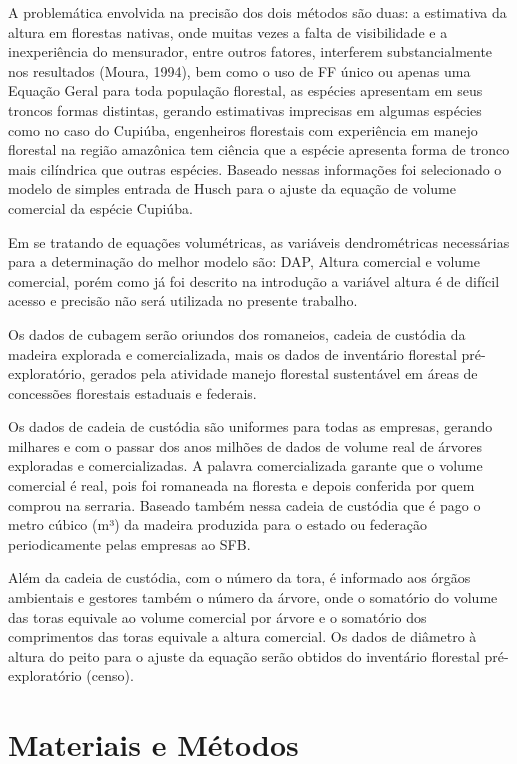 \documentclass[a4paper,12pt]{article}
\begin{document}
A problemática envolvida na precisão dos dois métodos são duas: a estimativa da altura em florestas nativas, onde muitas vezes a falta de visibilidade e a inexperiência do mensurador, entre outros fatores, interferem substancialmente nos resultados (Moura, 1994), bem como o uso de FF único ou apenas uma Equação Geral para toda população florestal, as espécies apresentam em seus troncos formas distintas, gerando estimativas imprecisas em algumas espécies como no caso do Cupiúba, engenheiros florestais com experiência em manejo florestal na região amazônica tem ciência que a espécie apresenta forma de tronco mais cilíndrica que outras espécies. Baseado nessas informações foi selecionado o modelo de simples entrada de Husch para o ajuste da equação de volume comercial da espécie Cupiúba.

Em se tratando de equações volumétricas, as variáveis dendrométricas necessárias para a determinação do melhor modelo são: DAP, Altura comercial e volume comercial, porém como já foi descrito na introdução a variável altura é de difícil acesso e precisão não será utilizada no presente trabalho. 

Os dados de cubagem serão oriundos dos romaneios, cadeia de custódia da madeira explorada e comercializada, mais os dados de inventário florestal pré-exploratório, gerados pela atividade manejo florestal sustentável em áreas de concessões florestais estaduais e federais.

Os dados de cadeia de custódia são uniformes para todas as empresas, gerando milhares e com o passar dos anos milhões de dados de volume real de árvores exploradas e comercializadas. A palavra comercializada garante que o volume comercial é real, pois foi romaneada na floresta e depois conferida por quem comprou na serraria. Baseado também nessa cadeia de custódia que é pago o metro cúbico (m³) da madeira produzida para o estado ou federação periodicamente pelas empresas ao SFB.

Além da cadeia de custódia, com o número da tora, é informado aos órgãos ambientais e gestores também o número da árvore, onde o somatório do volume das toras equivale ao volume comercial por árvore e o somatório dos comprimentos das toras equivale a altura comercial.  Os dados de diâmetro à altura do peito para o ajuste da equação serão obtidos do inventário florestal pré-exploratório (censo).

\section{Materiais e Métodos}
\end{document}
